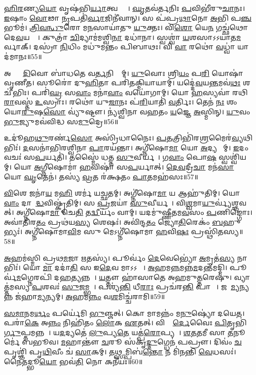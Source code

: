\ul{𑌹𑌿}\ul{𑌰}𑌣𑍍𑌯\ul{𑌯𑍋} 𑌵𑍃𑌷॑𑌭𑌿\ul{𑌰𑍍𑌯𑌾}𑌤𑍍𑌵𑌶𑍍𑌵𑍈𑌃᳚।
\ul{𑌘𑍃}𑌤𑌵॑𑌰𑍍𑌤𑌨𑌿𑌃 \ul{𑌪}𑌵𑌿𑌭𑍀॑𑌰𑍁\ul{𑌚𑌾}𑌨𑌃।
\ul{𑌇}𑌷𑌾𑌂 \ul{𑌵𑍋}𑌢𑌾 \ul{𑌨𑍃}𑌪𑌤𑌿॑\ul{𑌰𑍍𑌵𑌾}𑌜𑌿𑌨𑍀॑𑌵𑌾𑌨𑍍।
𑌸 𑌪॑𑌪𑍍𑌰\ul{𑌥𑌾}𑌨𑍋 \ul{𑌅}𑌭𑌿 𑌪\ul{𑌞𑍍𑌚} 𑌭𑍂𑌮॑।
\ul{𑌤𑍍𑌰𑌿}\ul{𑌵}\ul{𑌨𑍍𑌧𑍁}𑌰𑍋 𑌮\ul{𑌨}𑌸𑌾𑌯𑌾॑𑌤𑍁 \ul{𑌯𑍁}𑌕𑍍𑌤𑌃।
𑌵𑌿\ul{𑌶𑍋} 𑌯𑍇\ul{𑌨} 𑌗𑌚𑍍𑌛॑𑌥𑍋 𑌦𑍇\ul{𑌵}𑌯𑌨𑍍𑌤𑍀𑌃᳚।
𑌕𑍁𑌤𑍍𑌰𑌾॑ \ul{𑌚𑌿}𑌦𑍍𑌯𑌾𑌮॑𑌮𑌶𑍍𑌵𑌿\ul{𑌨𑌾} 𑌦𑌧𑌾॑𑌨𑌾।
𑌸𑍍𑌵𑌶𑍍𑌵𑌾॑ \ul{𑌯}𑌶𑌸𑌾\-𑌽𑌽𑌯𑌾॑𑌤\ul{𑌮}𑌰𑍍𑌵𑌾𑌕𑍍।
𑌦𑌸𑍍𑌰𑌾॑ \ul{𑌨𑌿}𑌧𑌿𑌂 𑌮𑌧𑍁॑𑌮𑌨𑍍𑌤𑌂 𑌪𑌿𑌬𑌾𑌥𑌃।
𑌵𑌿 \ul{𑌵𑌾}\ul{} 𑌰𑌥𑍋॑ \ul{𑌵}𑌧𑍍𑌵𑌾॑ 𑌯𑌾𑌦॑𑌮𑌾𑌨𑌃॥55॥

𑌅𑌨𑍍𑌤𑌾𑌂᳚ \ul{𑌦𑌿}𑌵𑍋 𑌬𑌾॑𑌧𑌤𑍇 𑌵\ul{𑌰𑍍𑌤}𑌨𑌿𑌭𑍍𑌯𑌾᳚𑌮𑍍।
\ul{𑌯𑍁}𑌵𑍋𑌃 𑌶𑍍𑌰𑌿\ul{𑌯𑌂} 𑌪\ul{𑌰𑌿} 𑌯𑍋𑌷𑌾॑𑌵𑍃𑌣𑍀𑌤।
𑌸𑍂𑌰𑍋॑ 𑌦𑍁\ul{𑌹𑌿}𑌤𑌾 𑌪𑌰𑌿॑𑌤𑌕𑍍𑌮𑌿𑌯𑌾𑌯𑌾𑌮𑍍।
𑌯𑌦𑍍𑌦𑍇॑\ul{𑌵}𑌯\ul{𑌨𑍍𑌤}𑌮𑌵॑\ul{𑌥𑌃} 𑌶𑌚𑍀॑𑌭𑌿𑌃।
𑌪𑌰𑌿॑\ul{𑌘𑍍𑌰}\ul{} 𑌸\ul{𑌵𑌾𑌂} 𑌮𑌨𑌾॑\ul{𑌵𑌾𑌂} 𑌵𑌯𑍋॑𑌗𑌾𑌮𑍍।
𑌯𑍋 \ul{𑌹}𑌸𑍍𑌯𑌵𑌾॑ 𑌰𑌥𑌿\ul{𑌰𑌾}𑌵𑌸𑍍𑌤॑ \ul{𑌉}𑌸𑍍𑌰𑌾𑌃।
𑌰𑌥𑍋॑ 𑌯𑍁\ul{𑌜𑌾}𑌨𑌃 𑌪॑\ul{𑌰𑌿}𑌯𑌾𑌤𑌿॑ \ul{𑌵}𑌰𑍍𑌤𑌿𑌃।
𑌤𑍇𑌨॑ \ul{𑌨𑌃} 𑌶𑌂 𑌯𑍋\ul{𑌰𑍁}𑌷\ul{𑌸𑍋} 𑌵𑍍𑌯𑍁॑𑌷𑍍𑌟𑍗।
𑌨𑍍𑌯॑𑌶𑍍𑌵𑌿𑌨𑌾 𑌵𑌹𑌤𑌂 \ul{𑌯}𑌜𑍍𑌞𑍇 \ul{𑌅}𑌸𑍍𑌮𑌿𑌨𑍍।
\ul{𑌯𑍁}𑌵𑌂 \ul{𑌭𑍁}𑌜𑍍𑌯𑍁𑌮𑌵॑𑌵𑌿𑌦𑍍𑌧 𑌸\ul{𑌮𑍁}𑌦𑍍𑌰𑍇॥56॥

𑌉𑌦𑍂॑𑌹\ul{𑌥𑍁}𑌰𑌰𑍍𑌣॑\ul{𑌸𑍋} 𑌅𑌸𑍍𑌰𑌿॑𑌧𑌾𑌨𑍈𑌃।
\ul{𑌪}\ul{𑌤}𑌤𑍍𑌰𑌿𑌭𑌿॑𑌰\ul{𑌶𑍍𑌰}𑌮𑍈𑌰॑\ul{𑌵𑍍𑌯}𑌥𑌿𑌭𑌿𑌃॑।
\ul{𑌦}\ul{}𑌸𑌨𑌾॑𑌭𑌿𑌰𑌶𑍍𑌵𑌿𑌨𑌾 \ul{𑌪𑌾}𑌰𑌯॑𑌨𑍍𑌤𑌾।
𑌅𑌗𑍍𑌨𑍀॑𑌷𑍋\ul{𑌮𑌾} 𑌯𑍋 \ul{𑌅}𑌦𑍍𑌯 𑌵𑌾᳚𑌮𑍍।
\ul{𑌇}𑌦𑌂 𑌵𑌚𑌃॑ 𑌸\ul{𑌪}𑌰𑍍𑌯𑌤𑌿॑।
𑌤𑌸𑍍𑌮𑍈॑ 𑌧𑌤𑍍𑌤 \ul{𑌸𑍁}𑌵𑍀𑌰𑍍𑌯𑌮𑍍᳚।
𑌗\ul{𑌵𑌾𑌂} 𑌪𑍋\ul{𑌷}\ul{} 𑌸𑍍𑌵𑌶𑍍𑌵𑌿॑𑌯𑌮𑍍।
𑌯𑍋 \ul{𑌅}𑌗𑍍𑌨𑍀𑌷𑍋𑌮𑌾॑ \ul{𑌹}𑌵𑌿𑌷𑌾॑ 𑌸\ul{𑌪}𑌰𑍍𑌯𑌾𑌤𑍍।
\ul{𑌦𑍇}\ul{𑌵}𑌦𑍍𑌰𑍀\ul{𑌚𑌾} 𑌮𑌨॑\ul{𑌸𑌾} 𑌯𑍋 \ul{𑌘𑍃}𑌤𑍇𑌨॑।
𑌤𑌸𑍍𑌯॑ \ul{𑌵𑍍𑌰}𑌤 𑌰॑𑌕𑍍𑌷𑌤𑌂 \ul{𑌪𑌾}𑌤𑌮𑌹॑𑌸𑌃॥57॥

\ul{𑌵𑌿}𑌶𑍇 𑌜𑌨𑌾॑\ul{𑌯} 𑌮\ul{𑌹𑌿} 𑌶𑌰𑍍𑌮॑ 𑌯𑌚𑍍𑌛𑌤𑌮𑍍।
𑌅𑌗𑍍𑌨𑍀॑𑌷𑍋\ul{𑌮𑌾} 𑌯 𑌆𑌹𑍁॑𑌤𑌿𑌮𑍍।
𑌯𑍋 \ul{𑌵𑌾𑌂} 𑌦𑌾𑌶𑌾᳚\ul{𑌦𑍍𑌧}𑌵𑌿𑌷𑍍𑌕𑍃॑𑌤𑌿𑌮𑍍।
𑌸 \ul{𑌪𑍍𑌰}𑌜𑌯𑌾॑ \ul{𑌸𑍁}𑌵𑍀𑌰𑍍𑌯𑌮𑍍᳚।
𑌵𑌿\ul{𑌶𑍍𑌵}𑌮𑌾\ul{𑌯𑍁}𑌰𑍍𑌵𑍍𑌯॑𑌶𑍍𑌞𑌵𑌤𑍍।
𑌅𑌗𑍍𑌨𑍀॑𑌷𑍋\ul{𑌮𑌾} 𑌚𑍇\ul{𑌤𑌿} 𑌤\ul{𑌦𑍍𑌵𑍀}𑌰𑍍𑌯𑌂॑ 𑌵𑌾𑌮𑍍।
𑌯𑌦𑌮𑍁॑𑌷𑍍𑌣𑍀𑌤𑌮\ul{𑌵}𑌸𑌂 \ul{𑌪}𑌣𑌿𑌙𑍍𑌗𑍋𑌃।
𑌅𑌵𑌾॑𑌤𑌿𑌰\ul{𑌤𑌂} 𑌪𑍍𑌰𑌥॑𑌯\ul{𑌸𑍍𑌯} 𑌶𑍇𑌷𑌃॑।
𑌅𑌵𑌿॑𑌨𑍍𑌦\ul{𑌤𑌂} 𑌜𑍍𑌯𑍋\ul{𑌤𑌿}𑌰𑍇𑌕𑌂॑ \ul{𑌬}𑌹𑍁𑌭𑍍𑌯𑌃॑।
𑌅𑌗𑍍𑌨𑍀॑𑌷𑍋𑌮𑌾\ul{𑌵𑌿}𑌮 𑌸𑍁 𑌮𑍇𑌽𑌗𑍍𑌨𑍀॑𑌷𑍋𑌮𑌾 \ul{𑌹}𑌵𑌿\ul{𑌷𑌃} 𑌪𑍍𑌰𑌸𑍍𑌥𑌿॑𑌤𑌸𑍍𑌯॥58॥\anuvakamend[\ul{𑌜}\ul{𑌭𑌾}\ul{𑌰} 𑌦𑍍𑌯𑍗\ul{𑌰}𑌗𑍍𑌨𑍇\ul{𑌰𑍁}𑌪𑌸𑍍𑌥॑ 𑌉\ul{𑌪}𑌕𑍍𑌷𑍍𑌯𑌨𑍍𑌤𑍋॑ 𑌬𑌦𑍍𑌬\ul{𑌧𑌾}𑌨𑍋 \ul{𑌵}𑌧𑍍𑌵𑌾॑ 𑌯𑌾𑌦॑𑌮𑌾𑌨𑌃 𑌸\ul{𑌮𑍁}𑌦𑍍𑌰𑍇\-𑌽\dng{ꣳ}𑌹॑\ul{𑌸𑌃} 𑌪𑍍𑌰𑌸𑍍𑌥𑌿॑𑌤𑌸𑍍𑌯]

\ul{𑌅}𑌹𑌮॑𑌸𑍍𑌮𑌿 𑌪𑍍𑌰𑌥\ul{𑌮}𑌜𑌾 \ul{𑌋}𑌤𑌸𑍍𑌯॑।
𑌪𑍂𑌰𑍍𑌵𑌂॑ \ul{𑌦𑍇}𑌵𑍇𑌭𑍍𑌯𑍋॑ \ul{𑌅}𑌮𑍃𑌤॑\ul{𑌸𑍍𑌯} 𑌨𑌾𑌭𑌿𑌃॑।
𑌯𑍋 \ul{𑌮𑌾} 𑌦𑌦𑌾॑\ul{𑌤𑌿} 𑌸 𑌇\ul{𑌦𑍇}𑌵 𑌮𑌾𑌽𑌽𑌵𑌾𑌃᳚।
\ul{𑌅}𑌹𑌮\ul{𑌨𑍍𑌨}𑌮𑌨𑍍𑌨॑\-\ul{𑌮}𑌦𑌨𑍍𑌤॑\-𑌮𑌦𑍍𑌮𑌿।
𑌪𑍂𑌰𑍍𑌵॑\ul{𑌮}𑌗𑍍𑌨𑍇𑌰𑌪𑌿॑ 𑌦\ul{𑌹}𑌤𑍍𑌯𑌨𑍍𑌨𑌮𑍍᳚।
\ul{𑌯}𑌤𑍍𑌤𑍗 𑌹𑌾॑𑌸𑌾𑌤𑍇 𑌅𑌹𑌮𑍁\ul{𑌤𑍍𑌤}𑌰𑍇𑌷𑍁॑।
𑌵𑍍𑌯𑌾𑌤𑍍𑌤॑𑌮𑌸𑍍𑌯 \ul{𑌪}𑌶𑌵𑌃॑ \ul{𑌸𑍁}𑌜𑌮𑍍𑌭𑌮𑍍᳚।
𑌪𑌶𑍍𑌯॑\ul{𑌨𑍍𑌤𑌿} 𑌧𑍀\ul{𑌰𑌾𑌃} 𑌪𑍍𑌰𑌚॑𑌰\ul{𑌨𑍍𑌤𑌿} 𑌪𑌾𑌕𑌾𑌃᳚।
𑌜𑌹𑌾᳚\ul{𑌮𑍍𑌯}𑌨𑍍𑌯𑌨𑍍𑌨 𑌜॑𑌹𑌾\ul{𑌮𑍍𑌯}𑌨𑍍𑌯𑌮𑍍।
\ul{𑌅}𑌹𑌮\ul{𑌨𑍍𑌨𑌂} 𑌵\ul{𑌶}𑌮𑌿𑌚𑍍𑌚॑𑌰𑌾𑌮𑌿॥59॥

\ul{𑌸}\ul{𑌮𑌾}𑌨𑌮\ul{𑌰𑍍𑌥𑌂} 𑌪𑌰𑍍𑌯𑍇॑𑌮𑌿 \ul{𑌭𑍁}𑌞𑍍𑌜𑌤𑍍।
𑌕𑍋 𑌮𑌾𑌮𑌨𑍍𑌨𑌂॑ 𑌮\ul{𑌨𑍁}𑌷𑍍𑌯𑍋॑ 𑌦𑌯𑍇𑌤।
𑌪𑌰𑌾॑\ul{𑌕𑍇} 𑌅\ul{𑌨𑍍𑌨𑌂} 𑌨𑌿𑌹𑌿॑𑌤𑌂 \ul{𑌲𑍋}𑌕 \ul{𑌏}𑌤𑌤𑍍।
𑌵𑌿𑌶𑍍𑌵𑍈᳚\ul{𑌰𑍍𑌦𑍇}𑌵𑍈𑌃 \ul{𑌪𑌿}𑌤𑍃𑌭𑌿॑\ul{𑌰𑍍𑌗𑍁}𑌪𑍍𑌤𑌮𑌨𑍍𑌨𑌮𑍍᳚।
𑌯\ul{𑌦}𑌦𑍍𑌯𑌤𑍇॑ \ul{𑌲𑍁}𑌪𑍍𑌯\ul{𑌤𑍇} 𑌯𑌤𑍍𑌪॑\ul{𑌰𑍋}𑌪𑍍𑌯𑌤𑍇᳚।
\ul{𑌶}\ul{𑌤}\ul{𑌤}𑌮𑍀 𑌸𑌾 \ul{𑌤}𑌨𑍂𑌰𑍍𑌮𑍇॑ 𑌬𑌭𑍂𑌵।
\ul{𑌮}𑌹𑌾𑌨𑍍𑌤𑍗॑ \ul{𑌚}𑌰𑍂 𑌸॑𑌕𑍃\ul{𑌦𑍍𑌦𑍁}𑌗𑍍𑌧𑍇𑌨॑ 𑌪𑌪𑍍𑌰𑍗।
𑌦𑌿𑌵𑌂॑ \ul{𑌚} 𑌪𑍃𑌶𑍍𑌞𑌿॑ 𑌪𑍃\ul{𑌥𑌿}𑌵𑍀𑌂 𑌚॑ \ul{𑌸𑌾}𑌕𑌮𑍍।
𑌤\ul{𑌥𑍍𑌸}𑌮𑍍𑌪𑌿𑌬॑\ul{𑌨𑍍𑌤𑍋} 𑌨 𑌮𑌿॑𑌨𑌨𑍍𑌤𑌿 \ul{𑌵𑍇}𑌧𑌸𑌃॑।
𑌨𑍈𑌤𑌦𑍍𑌭𑍂\ul{𑌯𑍋} 𑌭𑌵॑\ul{𑌤𑌿} 𑌨𑍋 𑌕𑌨𑍀॑𑌯𑌃॥60॥

